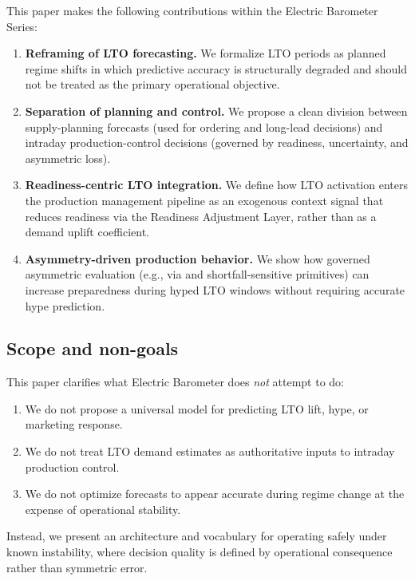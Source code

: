 This paper makes the following contributions within the Electric Barometer Series:
\begin{enumerate}[leftmargin=*, itemsep=2pt]
  \item \textbf{Reframing of LTO forecasting.} We formalize LTO periods as planned regime shifts in
  which predictive accuracy is structurally degraded and should not be treated as the primary
  operational objective.

  \item \textbf{Separation of planning and control.} We propose a clean division between
  supply-planning forecasts (used for ordering and long-lead decisions) and intraday
  production-control decisions (governed by readiness, uncertainty, and asymmetric loss).

  \item \textbf{Readiness-centric LTO integration.} We define how LTO activation enters the
  production management pipeline as an exogenous context signal that reduces readiness via
  the Readiness Adjustment Layer, rather than as a demand uplift coefficient.

  \item \textbf{Asymmetry-driven production behavior.} We show how governed asymmetric evaluation
  (e.g., via \CWSL{} and shortfall-sensitive primitives) can increase preparedness during hyped LTO
  windows without requiring accurate hype prediction.
\end{enumerate}

\subsection{Scope and non-goals}
\label{subsec:scope-nongoals}

This paper clarifies what Electric Barometer does \emph{not} attempt to do:
\begin{enumerate}[leftmargin=*, itemsep=2pt]
  \item We do not propose a universal model for predicting LTO lift, hype, or marketing response.
  \item We do not treat LTO demand estimates as authoritative inputs to intraday production control.
  \item We do not optimize forecasts to appear accurate during regime change at the expense of
  operational stability.
\end{enumerate}

Instead, we present an architecture and vocabulary for operating safely under known instability,
where decision quality is defined by operational consequence rather than symmetric error.

